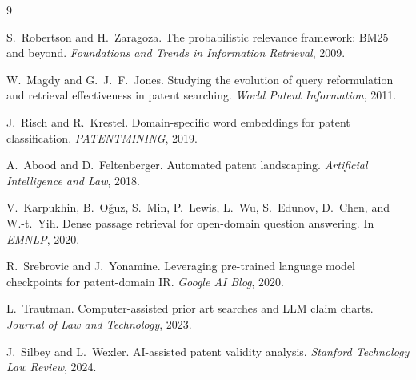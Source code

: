 \documentclass[11pt]{article}
\begin{document}
\begin{thebibliography}{9}

S.~Robertson and H.~Zaragoza.
\newblock The probabilistic relevance framework: BM25 and beyond.
\newblock \emph{Foundations and Trends in Information Retrieval}, 2009.

W.~Magdy and G.~J.~F.~Jones.
\newblock Studying the evolution of query reformulation and retrieval effectiveness in patent searching.
\newblock \emph{World Patent Information}, 2011.

J.~Risch and R.~Krestel.
\newblock Domain-specific word embeddings for patent classification.
\newblock \emph{PATENTMINING}, 2019.

A.~Abood and D.~Feltenberger.
\newblock Automated patent landscaping.
\newblock \emph{Artificial Intelligence and Law}, 2018.

V.~Karpukhin, B.~O\u{g}uz, S.~Min, P.~Lewis, L.~Wu, S.~Edunov, D.~Chen, and W.-t.~Yih.
\newblock Dense passage retrieval for open-domain question answering.
\newblock In \emph{EMNLP}, 2020.

R.~Srebrovic and J.~Yonamine.
\newblock Leveraging pre-trained language model checkpoints for patent-domain IR.
\newblock \emph{Google AI Blog}, 2020.

L.~Trautman.
\newblock Computer-assisted prior art searches and LLM claim charts.
\newblock \emph{Journal of Law and Technology}, 2023.

J.~Silbey and L.~Wexler.
\newblock AI-assisted patent validity analysis.
\newblock \emph{Stanford Technology Law Review}, 2024.

\end{thebibliography}
\end{document}

